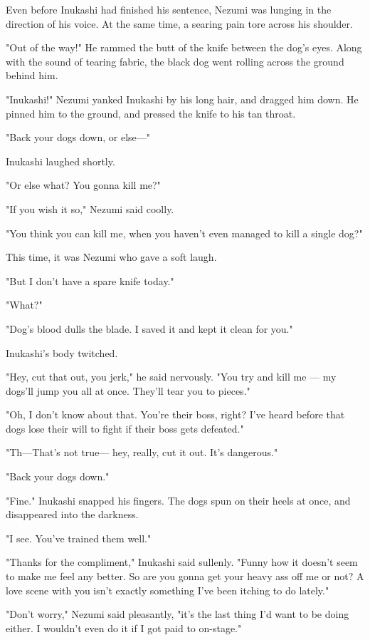 Even before Inukashi had finished his sentence, Nezumi was lunging in
the direction of his voice. At the same time, a searing pain tore across
his shoulder.

"Out of the way!" He rammed the butt of the knife between the dog's
eyes. Along with the sound of tearing fabric, the black dog went rolling
across the ground behind him.

"Inukashi!" Nezumi yanked Inukashi by his long hair, and dragged him
down. He pinned him to the ground, and pressed the knife to his tan
throat.

"Back your dogs down, or else---"

Inukashi laughed shortly.

"Or else what? You gonna kill me?"

"If you wish it so," Nezumi said coolly.

"You think you can kill me, when you haven't even managed to kill a
single dog?"

This time, it was Nezumi who gave a soft laugh.

"But I don't have a spare knife today."

"What?"

"Dog's blood dulls the blade. I saved it and kept it clean for you."

Inukashi's body twitched.

"Hey, cut that out, you jerk," he said nervously. "You try and kill me ---
my dogs'll jump you all at once. They'll tear you to pieces."

"Oh, I don't know about that. You're their boss, right? I've heard
before that dogs lose their will to fight if their boss gets defeated."

"Th---That's not true--- hey, really, cut it out. It's dangerous."

"Back your dogs down."

"Fine." Inukashi snapped his fingers. The dogs spun on their heels at
once, and disappeared into the darkness.

"I see. You've trained them well."

"Thanks for the compliment," Inukashi said sullenly. "Funny how it
doesn't seem to make me feel any better. So are you gonna get your heavy
ass off me or not? A love scene with you isn't exactly something I've
been itching to do lately."

"Don't worry," Nezumi said pleasantly, "it's the last thing I'd want to
be doing either. I wouldn't even do it if I got paid to on-stage."


